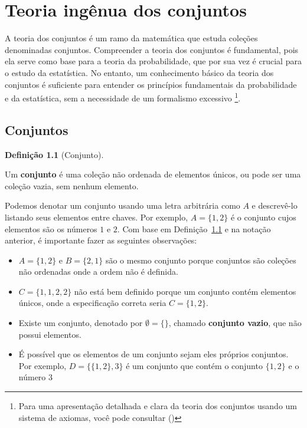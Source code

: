 \documentclass[
  letterpaper,
]{book}
\theoremstyle{definition}
\newtheorem{definition}{Definição}[chapter]
\theoremstyle{plain}
\theoremstyle{remark}
\begin{document}
\chapter{Teoria ingênua dos
conjuntos}\label{teoria-inguxeanua-dos-conjuntos}

A teoria dos conjuntos é um ramo da matemática que estuda coleções
denominadas conjuntos. Compreender a teoria dos conjuntos é fundamental,
pois ela serve como base para a teoria da probabilidade, que por sua vez
é crucial para o estudo da estatística. No entanto, um conhecimento
básico da teoria dos conjuntos é suficiente para entender os princípios
fundamentais da probabilidade e da estatística, sem a necessidade de um
formalismo excessivo \footnote{Para uma apresentação detalhada e clara
  da teoria dos conjuntos usando um sistema de axiomas, você pode
  consultar ()}.

\section{Conjuntos}\label{conjuntos}

\begin{definition}[Conjunto]\protect\hypertarget{def-set}{}\label{def-set}

Um \textbf{conjunto} é uma coleção não ordenada de elementos únicos, ou
pode ser uma coleção vazia, sem nenhum elemento.

\end{definition}

Podemos denotar um conjunto usando uma letra arbitrária como \(A\) e
descrevê-lo listando seus elementos entre chaves. Por exemplo,
\(A = \{ 1,2 \}\) é o conjunto cujos elementos são os números \(1\) e
\(2\). Com base em Definição~\ref{def-set} e na notação anterior, é
importante fazer as seguintes observações:

\begin{itemize}
\item
  \(A = \{ 1, 2 \}\) e \(B = \{ 2, 1 \}\) são o mesmo conjunto porque
  conjuntos são coleções não ordenadas onde a ordem não é definida.
\item
  \(C = \{ 1, 1, 2, 2 \}\) não está bem definido porque um conjunto
  contém elementos únicos, onde a especificação correta seria
  \(C = \{ 1, 2 \}\).
\item
  Existe um conjunto, denotado por \(\emptyset = \{ \}\), chamado
  \textbf{conjunto vazio}, que não possui elementos.
\item
  É possível que os elementos de um conjunto sejam eles próprios
  conjuntos. Por exemplo, \(D = \{ \{ 1, 2\}, 3 \}\) é um conjunto que
  contém o conjunto \(\{ 1, 2\}\) e o número \(3\)
\end{itemize}
\end{document}
